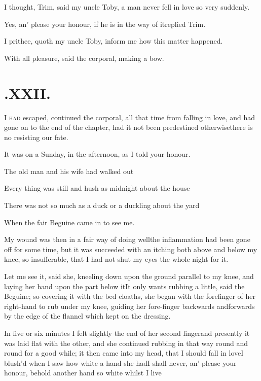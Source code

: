 \documentclass{article}
\begin{document}
\newpage
I thought, Trim, said my uncle\break
Toby, a man never fell in love so very\break
suddenly.

Yes, an’ please your honour, if\break
he is in the way of it\tsh replied\break
Trim.

I prithee, quoth my uncle Toby,\break
inform me how this matter happened.

\tsh With all pleasure, said the corporal, making a
bow.

\newpage
\section{.\enspace XXII.}

\lettrine{I}{ had} escaped, continued the
corporal, all that time from falling in love, and had gone on to
the end of the chapter, had it not been predestined
otherwise\tsh\break there is no resisting our fate.

It was on a Sunday, in the afternoon, as I told your
honour.

The old man and his wife had walked
out\tsh

Every thing was still and hush as midnight about the
house\tsh

There was not so much as a duck or a duckling about the
yard\tsh

\newpage
\tsh When the fair Beguine came in to see
me.

My wound was then in a fair way of doing well\tsh the
inflammation had been gone off for some time, but it was succeeded
with an itching both above and below my knee, so insufferable, that
I had not shut my eyes the whole night for it.

Let me see it, said she, kneeling down upon the ground parallel
to my knee, and laying her hand upon the part below
it\tsh It only wants rubbing a little, said the
Beguine; so covering it with the bed cloaths, she began with
the forefinger of her right-hand to rub under my knee, guiding her
fore-finger backwards and\pb forwards by the edge of the flannel which
kept on the dressing.

In five or six minutes I felt slightly the end of
her second finger\tsk and presently it was laid flat with the
other, and she continued rubbing in that way round and round for a
good while; it then came into my head, that I should fall in
love\tsk\break I blush’d when I saw how white a hand she
had\tsk I shall never, an’ please your honour, behold
another hand so white whilst I live\tsh
\end{document}

